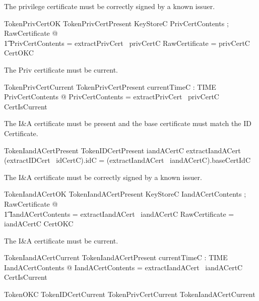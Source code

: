 The privilege certificate must be correctly signed by a known issuer.

\begin{schema}{TokenPrivCertOK}
        TokenPrivCertPresent
\also
        KeyStoreC
\where
   \exists PrivCertContents ; RawCertificate @ 
\\ \t1          \theta PrivCertContents = extractPrivCert~ privCertC 
                \land \theta RawCertificate = privCertC 
          \land CertOKC  
\end{schema}

The Priv certificate must be current.

\begin{schema}{TokenPrivCertCurrent}
        TokenPrivCertPresent
\also
        currentTimeC : TIME
\where
   \exists PrivCertContents @ 
                \theta PrivCertContents = extractPrivCert~ privCertC 
          \land CertIsCurrent  
\end{schema}

The I\&A certificate must be present and the base certificate
must match the ID Certificate.

\begin{schema}{TokenIandACertPresent}
        TokenIDCertPresent
\where
            iandACertC \in \dom extractIandACert
\\            (extractIDCert~ idCertC).idC = (extractIandACert~ iandACertC).baseCertIdC   
\end{schema}

The I\&A certificate must be correctly signed by a known issuer.

\begin{schema}{TokenIandACertOK}
        TokenIandACertPresent
\also
        KeyStoreC
\where
      \exists IandACertContents ; RawCertificate @ 
\\ \t1          \theta IandACertContents = extractIandACert~ iandACertC 
                \land \theta RawCertificate = iandACertC \land CertOKC  
\end{schema}

The I\&A certificate must be current.

\begin{schema}{TokenIandACertCurrent}
        TokenIandACertPresent
\also
        currentTimeC : TIME
\where
        \exists IandACertContents  @ 
       \theta IandACertContents = extractIandACert~
iandACertC 
 \land CertIsCurrent
\end{schema}

\begin{zed}
TokenOKC  TokenIDCertCurrent \land
        TokenPrivCertCurrent \land TokenIandACertCurrent
\end{zed}

